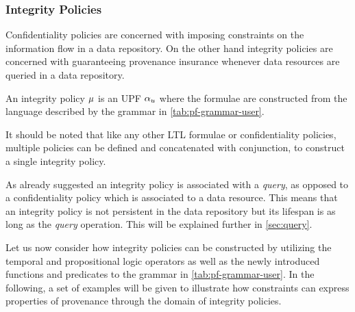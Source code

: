 \subsubsection{Integrity Policies}
Confidentiality policies are concerned with imposing constraints on the information flow in a data repository. On the other hand integrity policies are concerned with guaranteeing provenance insurance whenever data resources are queried in a data repository.
\begin{definition}\label{def:ip}
An integrity policy $\mu$ is an UPF $\alpha_u$ where the formulae are constructed from the language described by the grammar in \autoref{tab:pf-grammar-user}.
\end{definition}
It should be noted that like any other LTL formulae or confidentiality policies, multiple policies can be defined and concatenated with conjunction, to construct a single integrity policy.

As already suggested an integrity policy is associated with a \emph{query}, as opposed to a confidentiality policy which is associated to a data resource. This means that an integrity policy is not persistent in the data repository but its lifespan is as long as the \emph{query} operation. This will be explained further in \autoref{sec:query}.

Let us now consider how integrity policies can be constructed by utilizing the temporal and propositional logic operators as well as the newly introduced functions and predicates to the grammar in \autoref{tab:pf-grammar-user}. In the following, a set of examples will be given to illustrate how constraints can express properties of provenance through the domain of integrity policies.

